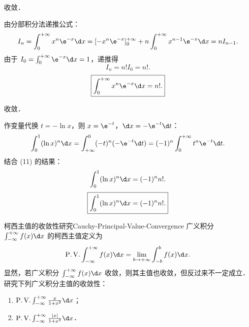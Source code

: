 \begin{solution}
     收敛．

    由分部积分法递推公式：
    \begin{equation}
        I_n = \int_0^{+\infty} x^n \e^{-x} \d x = [-x^n \e^{-x}]_0^{+\infty} + n \int_0^{+\infty} x^{n-1}\e^{-x} \d x = n I_{n-1}.
    \end{equation}
    由于 $I_0 = \int_0^{+\infty} \e^{-x} \d x = 1$，递推得
    \begin{equation}
        I_n = n! I_0 = n!.
    \end{equation}
    \begin{equation}
        \boxed{\int_0^{+\infty} x^n \e^{-x} \d x = n!.}
    \end{equation}

     收敛．

    作变量代换 $t = -\ln x$，则 $x = \e^{-t}$，$\d x = -\e^{-t}\d t$：
    \begin{equation}
        \int_0^1 (\ln x)^n \d x = \int_{+\infty}^0 (-t)^n (-\e^{-t}\d t) = (-1)^n \int_0^{+\infty} t^n \e^{-t} \d t.
    \end{equation}
    结合 (11) 的结果：
    \begin{equation}
        \int_0^1 (\ln x)^n \d x = (-1)^n n!.
    \end{equation}
    \begin{equation}
        \boxed{\int_0^1 (\ln x)^n \d x = (-1)^n n!.}
    \end{equation}
\end{solution}

\begin{problem}{柯西主值的收敛性研究}{Cauchy-Principal-Value-Convergence}
    广义积分 $\int_{-\infty}^{+\infty} f(x) \d x$ 的柯西主值定义为
    \begin{equation}
        \operatorname{P.V.} \int_{-\infty}^{+\infty} f(x) \d x = \lim_{b\to +\infty} \int_{-b}^b f(x) \d x.
    \end{equation}
    显然，若广义积分 $\int_{-\infty}^{+\infty} f(x) \d x$ 收敛，则其主值也收敛，但反过来不一定成立．研究下列广义积分主值的收敛性：
    \begin{enumerate}
        \item $\operatorname{P.V.} \int_{-\infty}^{+\infty} \frac{x}{1 + x^2} \d x$；
        \item $\operatorname{P.V.} \int_{-\infty}^{+\infty} \frac{|x|}{1 + x^2} \d x$．
    \end{enumerate}
\end{problem}

